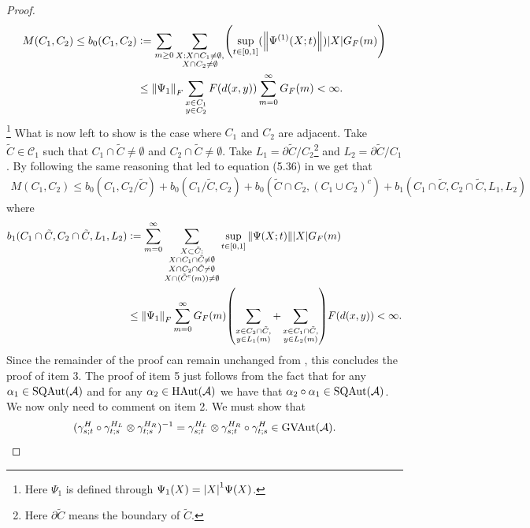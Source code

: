 \documentclass[11pt,a4paper,twoside]{article}
\numberwithin{equation}{section}
\begin{document}
\begin{proof}
		\begin{align}
			M(C_1,C_2)\leq b_0(C_1,C_2) &\defeq \sum_{m\geq 0}\sum_{\substack{X:X\cap C_1\neq\emptyset,\\X\cap C_2\neq\emptyset}}\left(\sup_{t\in[0,1]}(\norm{\Psi^{(1)}(X;t)})\abs{X}G_F(m)\right)\\
			&\leq \norm{\Psi_1}_F\sum_{\substack{x\in C_1\\y\in C_2}}F(d(x,y))\sum_{m=0}^\infty G_F(m)<\infty.
		\end{align}
		\footnote{Here $\Psi_1$ is defined through $\Psi_1(X)=\abs{X}^1 \Psi(X)$.} What is now left to show is the case where $C_1$ and $C_2$ are adjacent. Take $\tilde{C}\in\mathcal{C}_1$ such that $C_1\cap\tilde{C}\neq\emptyset$ and $C_2\cap\tilde{C}\neq\emptyset$. Take $L_1=\partial\tilde{C}/C_2$\footnote{Here $\partial \tilde{C}$ means the boundary of $\tilde C$.} and $L_2=\partial\tilde{C}/C_1$. By following the same reasoning that led to equation (5.36) in \cite{ogata2021h3gmathbb} we get that
		\begin{align}
			M(C_1,C_2)\leq b_0(C_1,C_2/\tilde{C})+b_0(C_1/\tilde{C},C_2)+b_0(\tilde{C}\cap C_2,(C_1\cup C_2)^c)+b_1(C_1\cap\tilde{C},C_2\cap\tilde{C},L_1,L_2)
		\end{align}
		where
		\begin{align}
			b_1(C_1\cap\tilde{C},C_2\cap\tilde{C},L_1,L_2)&\defeq\sum_{m=0}^\infty \sum_{\substack{X\subset \tilde{C}:\\ X\cap C_1\cap\tilde{C}\neq\emptyset\\X\cap C_2\cap\tilde{C}\neq\emptyset\\ X\cap (\tilde{C}^c(m))\neq\emptyset}}\sup_{t\in[0,1]}\norm{\Psi(X;t)}\abs{X}G_F(m)\\
			&\leq \norm{\Psi_1}_F\sum_{m=0}^{\infty}G_F(m)\left(\sum_{\substack{x\in C_2\cap\tilde{C},\\y\in L_1(m)}}+\sum_{\substack{x\in C_1\cap\tilde{C},\\y\in L_2(m)}}\right)F(d(x,y))<\infty.
		\end{align}
		Since the remainder of the proof can remain unchanged from \cite{ogata2021h3gmathbb}, this concludes the proof of item 3. The proof of item 5 just follows from the fact that for any $\alpha_1\in\textrm{SQAut}(\AA)$ and for any $\alpha_2\in\textrm{HAut}(\AA)$ we have that $\alpha_2\circ\alpha_1\in\textrm{SQAut}(\AA)$. We now only need to comment on item 2. We must show that
		\begin{equation}
			(\gamma^H_{s;t}\circ\gamma^{H_L}_{t;s}\otimes\gamma^{H_R}_{t;s})^{-1}=\gamma^{H_L}_{s;t}\otimes\gamma^{H_R}_{s;t}\circ\gamma^H_{t;s}\in\textrm{GVAut}(\AA).

\end{equation}
\end{proof}
\end{document}
